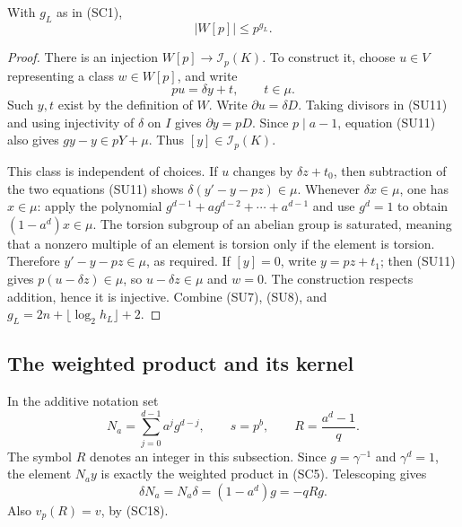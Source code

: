 \begin{lemma}\label{su-rank}
With $g_L$ as in (SC1),
\[
                           |W[p]|\le p^{g_L}.
                           \tag{SU10}
\]
\end{lemma}
\begin{proof}
There is an injection $W[p]\to\mathcal I_p(K)$.
To construct it, choose $u\in V$ representing a class
$w\in W[p]$, and write
\[
                         pu=\delta y+t,\qquad t\in\mu .
                         \tag{SU11}
\]
Such $y,t$ exist by the definition of $W$.
Write $\partial u=\delta D$.
Taking divisors in (SU11) and using injectivity of
$\delta$ on $I$ gives $\partial y=pD$.
Since $p\mid a-1$, equation (SU11) also gives
$gy-y\in pY+\mu$.  Thus $[y]\in\mathcal I_p(K)$.

This class is independent of choices.  If $u$ changes by
$\delta z+t_0$, then subtraction of the two equations
(SU11) shows
$\delta(y'-y-pz)\in\mu$.  Whenever $\delta x\in\mu$,
one has $x\in\mu$: apply the polynomial
$g^{d-1}+ag^{d-2}+\cdots+a^{d-1}$ and use
$g^d=1$ to obtain $(1-a^d)x\in\mu$.
The torsion subgroup of an abelian group is saturated,
meaning that a nonzero multiple of an element is torsion
only if the element is torsion.  Therefore
$y'-y-pz\in\mu$, as required.
If $[y]=0$, write $y=pz+t_1$; then (SU11) gives
$p(u-\delta z)\in\mu$, so $u-\delta z\in\mu$ and $w=0$.
The construction respects addition, hence it is injective.
Combine (SU7), (SU8), and
$g_L=2n+\lfloor\log_2h_L\rfloor+2$.
\end{proof}

\subsection{The weighted product and its kernel}

In the additive notation set
\[
       N_a=\sum_{j=0}^{d-1}a^j g^{d-j},\qquad
       s=p^b,\qquad
       R=\frac{a^d-1}{q}.
       \tag{SU12}
\]
The symbol $R$ denotes an integer in this subsection.
Since $g=\gamma^{-1}$ and $\gamma^d=1$, the element
$N_a y$ is exactly the weighted product in (SC5).
Telescoping gives
\[
                    \delta N_a=N_a\delta=(1-a^d)g=-qRg.
                    \tag{SU13}
\]
Also $v_p(R)=v$, by (SC18).


